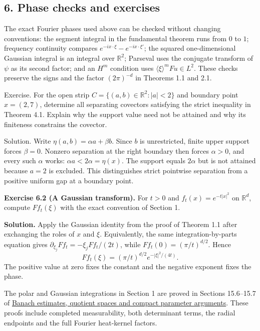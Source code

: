 \documentclass[
  11pt,
]{article}
\begin{document}
\subsection{6. Phase checks and
exercises}\label{phase-checks-and-exercises}

The exact Fourier phases used above can be checked without changing
conventions: the segment integral in the fundamental theorem runs from
\(0\) to \(1\); frequency continuity compares
\(e^{-ix\cdot\xi}-e^{-ix\cdot\xi'}\); the squared one-dimensional
Gaussian integral is an integral over \(\mathbb R^2\); Parseval uses the
conjugate transform of \(\psi\) as its second factor; and an \(H^m\)
condition uses \(\langle\xi\rangle^{m}Fu\in L^2\). These checks preserve
the signs and the factor \((2\pi)^{-d}\) in Theorems 1.1 and 2.1.

Exercise. For the open strip \(C=\{(a,b)\in\mathbb R^2:|a|<2\}\) and
boundary point \(x=(2,7)\), determine all separating covectors
satisfying the strict inequality in Theorem 4.1. Explain why the support
value need not be attained and why its finiteness constrains the
covector.

Solution. Write \(\eta(a,b)=\alpha a+\beta b\). Since \(b\) is
unrestricted, finite upper support forces \(\beta=0\). Nonzero
separation at the right boundary then forces \(\alpha>0\), and every
such \(\alpha\) works: \(\alpha a<2\alpha=\eta(x)\). The support equals
\(2\alpha\) but is not attained because \(a=2\) is excluded. This
distinguishes strict pointwise separation from a positive uniform gap at
a boundary point.

\textbf{Exercise 6.2 (A Gaussian transform).} For \(t>0\) and
\(f_t(x)=e^{-t|x|^2}\) on \(\mathbb R^d\), compute \(Ff_t(\xi)\) with
the exact convention of Section 1.

\textbf{Solution.} Apply the Gaussian identity from the proof of Theorem
1.1 after exchanging the roles of \(x\) and \(\xi\). Equivalently, the
same integration-by-parts equation gives
\(\partial_{\xi_j}Ff_t=-\xi_jFf_t/(2t)\), while
\(Ff_t(0)=(\pi/t)^{d/2}\). Hence \[
Ff_t(\xi)=(\pi/t)^{d/2}e^{-|\xi|^2/(4t)}.
\] The positive value at zero fixes the constant and the negative
exponent fixes the phase.

The polar and Gaussian integrations in Section 1 are proved in Sections
15.6--15.7 of
\href{banach-foundation-bridges.pdf}{Banach
estimates, quotient spaces and compact parameter arguments}. These
proofs include completed measurability, both determinant terms, the
radial endpoints and the full Fourier heat-kernel factors.
\end{document}
